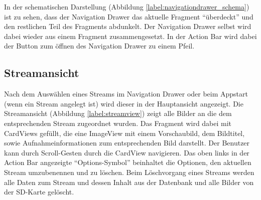 In der schematischen Darstellung (Abbildung \ref{label:navigationdrawer_schema}) ist zu sehen, dass der Navigation Drawer das aktuelle Fragment \enquote{überdeckt} und den restlichen Teil des Fragments abdunkelt. Der Navigation Drawer selbst wird dabei wieder aus einem Fragment zusammengesetzt. In der Action Bar wird dabei der Button zum öffnen des Navigation Drawer zu einem Pfeil.

\subsection{Streamansicht}
Nach dem Auswählen eines Streams im Navigation Drawer oder beim Appstart (wenn ein Stream angelegt ist) wird dieser in der Hauptansicht angezeigt. Die Streamansicht (Abbildung  \ref{label:streamview}) zeigt alle Bilder an die dem entsprechenden Stream zugeordnet wurden. Das Fragment wird dabei mit CardViews gefüllt, die eine ImageView mit einem Vorschaubild, dem Bildtitel, sowie Aufnahmeinformationen zum entsprechenden Bild darstellt. Der Benutzer kann durch Scroll-Gesten durch die CardView navigieren. Das oben links in der Action Bar angezeigte \enquote{Options-Symbol} beinhaltet die Optionen, den aktuellen Stream umzubenennen und zu löschen. Beim Löschvorgang eines Streams werden alle Daten zum Stream und dessen Inhalt aus der Datenbank und alle Bilder von der SD-Karte gelöscht.

